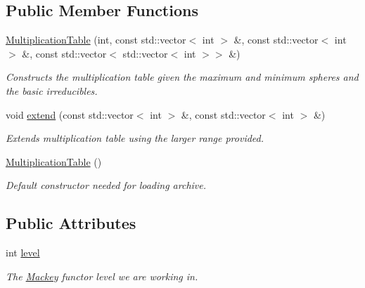 \subsection*{Public Member Functions}
\begin{DoxyCompactItemize}
\item 
\hyperlink{classMackey_1_1MultiplicationTable_a8530e27d8d2c3c755eb5041a2ee8c35b}{Multiplication\+Table} (int, const std\+::vector$<$ int $>$ \&, const std\+::vector$<$ int $>$ \&, const std\+::vector$<$ std\+::vector$<$ int $>$$>$ \&)
\begin{DoxyCompactList}\small\item\em Constructs the multiplication table given the maximum and minimum spheres and the basic irreducibles. \end{DoxyCompactList}\item 
void \hyperlink{classMackey_1_1MultiplicationTable_a4371e6ba8a058073c005e636979b7230}{extend} (const std\+::vector$<$ int $>$ \&, const std\+::vector$<$ int $>$ \&)
\begin{DoxyCompactList}\small\item\em Extends multiplication table using the larger range provided. \end{DoxyCompactList}\item 
\hyperlink{classMackey_1_1MultiplicationTable_ac3bc2d09599a994b2b159def52484bae}{Multiplication\+Table} ()
\begin{DoxyCompactList}\small\item\em Default constructor needed for loading archive. \end{DoxyCompactList}\end{DoxyCompactItemize}
\subsection*{Public Attributes}
\begin{DoxyCompactItemize}
\item 
int \hyperlink{classMackey_1_1MultiplicationTable_ad5a05c126e0b3c769fa9b1196a8db96a}{level}
\begin{DoxyCompactList}\small\item\em The \hyperlink{namespaceMackey}{Mackey} functor level we are working in. \end{DoxyCompactList}\end{DoxyCompactItemize}
